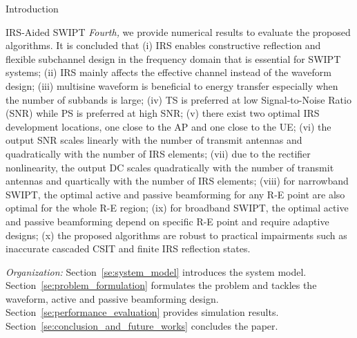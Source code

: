 \documentclass[journal]{IEEEtran}
\begin{document}
\begin{section}{Introduction}
\begin{subsection}{IRS-Aided SWIPT}
			\emph{Fourth,} we provide numerical results to evaluate the proposed algorithms. It is concluded that (i) IRS enables constructive reflection and flexible subchannel design in the frequency domain that is essential for SWIPT systems; (ii) IRS mainly affects the effective channel instead of the waveform design; (iii) multisine waveform is beneficial to energy transfer especially when the number of subbands is large; (iv) TS is preferred at low Signal-to-Noise Ratio (SNR) while PS is preferred at high SNR; (v) there exist two optimal IRS development locations, one close to the AP and one close to the UE; (vi) the output SNR scales linearly with the number of transmit antennas and quadratically with the number of IRS elements; (vii) due to the rectifier nonlinearity, the output DC scales quadratically with the number of transmit antennas and quartically with the number of IRS elements; (viii) for narrowband SWIPT, the optimal active and passive beamforming for any R-E point are also optimal for the whole R-E region; (ix) for broadband SWIPT, the optimal active and passive beamforming depend on specific R-E point and require adaptive designs; (x) the proposed algorithms are robust to practical impairments such as inaccurate cascaded CSIT and finite IRS reflection states.

			\emph{Organization:} Section~\ref{se:system_model} introduces the system model. Section~\ref{se:problem_formulation} formulates the problem and tackles the waveform, active and passive beamforming design. Section~\ref{se:performance_evaluation} provides simulation results. Section~\ref{se:conclusion_and_future_works} concludes the paper.


\end{subsection}
\end{section}
\end{document}
